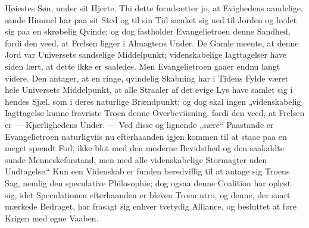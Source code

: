 \documentclass[12pt,a4paper]{book}
\begin{document}
Høiestes Søn, under sit Hjerte. Thi dette forudsætter jo, at Evighedens
aandelige, sande Himmel har paa sit Sted og til sin Tid sænket sig ned til
Jorden og hvilet sig paa en skrøbelig Qvinde; og dog fastholder Evangelietroen
denne Sandhed, fordi den veed, at Frelsen ligger i Almagtens Under. De Gamle
meente, at denne Jord var Universets sandselige Middelpunkt; videnskabelige
Iagttagelser have siden lært, at dette ikke er saaledes. Men Evangelietroen
gaaer endnu langt videre. Den antager, at en ringe, qvindelig Skabning har i
Tidens Fylde været hele Universets Middelpunkt, at alle Straaler af det evige
Lys have samlet sig i hendes Sjæl, som i deres naturlige Brændpunkt; og dog skal
ingen „videnskabelig Iagttagelse kunne fravriste Troen denne Overbeviisning,
fordi den veed, at Frelsen er --- Kjærlighedens Under. --- Ved disse og lignende
„sære“ Paastande er Evangelietroen naturligviis nu efterhaanden igjen kommen til
at staae paa en meget spændt Fod, ikke blot med den moderne Bevidsthed og den
saakaldte sunde Menneskeforstand, men med alle videnskabelige Stormagter uden
Undtagelse.“ Kun een Videnskab er funden beredvillig til at antage sig Troens
Sag, nemlig den speculative Philosophie; dog ogsaa denne Coalition har opløst
sig, idet Speculationen efterhaanden er bleven Troen utro, og denne, der snart
mærkede Bedraget, har frasagt sig enhver tvetydig Alliance, og besluttet at føre
Krigen med egne Vaaben.
\end{document}
